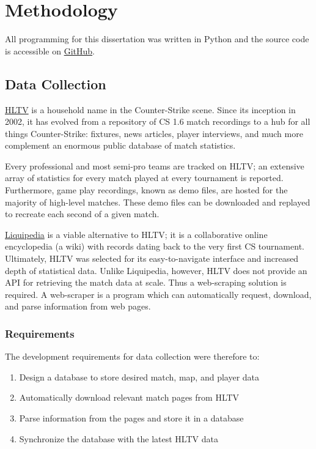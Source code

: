 \chapter{Methodology}
\label{Methodology}

All programming for this dissertation was written in Python \cite{python} and the source code is accessible on \href{https://github.com/zakdux/counter-strike}{GitHub}.

\section{Data Collection}

\href{https://www.hltv.org/}{HLTV} is a household name in the Counter-Strike scene. Since its inception in 2002, it has evolved from a repository of CS 1.6 match recordings to a hub for all things Counter-Strike: fixtures, news articles, player interviews, and much more complement an enormous public database of match statistics. 

Every professional and most semi-pro teams are tracked on HLTV; an extensive array of statistics for every match played at every tournament is reported. Furthermore, game play recordings, known as demo files, are hosted for the majority of high-level matches. These demo files can be downloaded and replayed to recreate each second of a given match.

\href{https://liquipedia.net/counterstrike/}{Liquipedia} is a viable alternative to HLTV; it is a collaborative online encyclopedia (a wiki) with records dating back to the very first CS tournament. Ultimately, HLTV was selected for its easy-to-navigate interface and increased depth of statistical data. Unlike Liquipedia, however, HLTV does not provide an API for retrieving the match data at scale. Thus a web-scraping solution is required. A web-scraper is a program which can automatically request, download, and parse information from web pages.

\subsection{Requirements}

The development requirements for data collection were therefore to:

\begin{enumerate}
\item{Design a database to store desired match, map, and player data}
\item{Automatically download relevant match pages from HLTV}
\item{Parse information from the pages and store it in a database}
\item{Synchronize the database with the latest HLTV data}
\end{enumerate}

